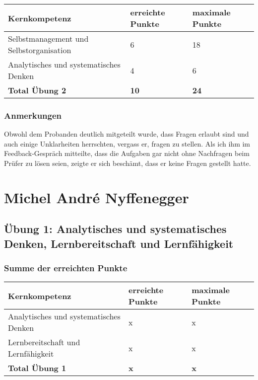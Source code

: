 \begin{center}
  \begin{tabular}{ | p{7cm} | p{3cm} | p{3cm} |}
   \hline
   \textbf{Kernkompetenz} & \textbf{erreichte Punkte} & \textbf{maximale Punkte} \\ \hline
   Selbstmanagement und Selbstorganisation & 6 & 18\\ \hline
   Analytisches und systematisches Denken & 4 & 6\\ \hline
   \textbf{Total Übung 2} & \textbf{10} & \textbf{24}\\ \hline
  \end{tabular}
\end{center}

\subsubsection{Anmerkungen}
Obwohl dem Probanden deutlich mitgeteilt wurde, dass Fragen erlaubt sind und auch einige Unklarheiten herrschten, vergass er, fragen zu stellen. Als ich ihm im Feedback-Gespräch mitteilte, dass die Aufgaben gar nicht ohne Nachfragen beim Prüfer zu lösen seien, zeigte er sich beschämt, dass er keine Fragen gestellt hatte.

\section{Michel André Nyffenegger}
\subsection{Übung 1: Analytisches und systematisches Denken, Lernbereitschaft und Lernfähigkeit}
\subsubsection{Summe der erreichten Punkte}
\begin{center}
  \begin{tabular}{ | p{7cm} | p{3cm} | p{3cm} |}
   \hline
   \textbf{Kernkompetenz} & \textbf{erreichte Punkte} & \textbf{maximale Punkte} \\ \hline
   Analytisches und systematisches Denken & x & x\\ \hline
  Lernbereitschaft und Lernfähigkeit & x & x\\ \hline
   \textbf{Total Übung 1} & \textbf{x} & \textbf{x}\\ \hline
  \end{tabular}
\end{center}
